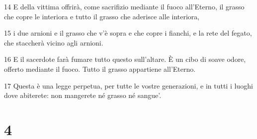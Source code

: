\par 14 E della vittima offrirà, come sacrifizio mediante il fuoco all'Eterno, il grasso che copre le interiora e tutto il grasso che aderisce alle interiora,
\par 15 i due arnioni e il grasso che v'è sopra e che copre i fianchi, e la rete del fegato, che staccherà vicino agli arnioni.
\par 16 E il sacerdote farà fumare tutto questo sull'altare. È un cibo di soave odore, offerto mediante il fuoco. Tutto il grasso appartiene all'Eterno.
\par 17 Questa è una legge perpetua, per tutte le vostre generazioni, e in tutti i luoghi dove abiterete: non mangerete né grasso né sangue'.

\chapter{4}

